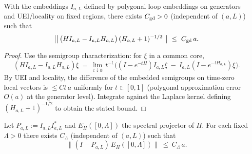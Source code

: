 \documentclass[11pt]{amsart}
\begin{document}
\begin{lemma}\label{lem:graph-defect-Oa}
With the embeddings $I_{a,L}$ defined by polygonal loop embeddings on generators and UEI/locality on fixed regions, there exists $C_{\rm gd}>0$ (independent of $(a,L)$) such that
\[
  \big\|\,\big(H I_{a,L}-I_{a,L} H_{a,L}\big)\,(H_{a,L}+1)^{-1/2}\,\big\|\ \le\ C_{\rm gd}\,a.
\]
\end{lemma}

\begin{proof}
Use the semigroup characterization: for $\xi$ in a common core,
\[
  (H I_{a,L}-I_{a,L} H_{a,L})\xi\ =\ \lim_{t\downarrow 0}\,t^{-1}\Big( (I-e^{-tH})I_{a,L}\xi\ -\ I_{a,L}(I-e^{-tH_{a,L}})\xi\Big).
\]
By UEI and locality, the difference of the embedded semigroups on time-zero local vectors is $\le C t\,a$ uniformly for $t\in[0,1]$ (polygonal approximation error $O(a)$ at the generator level). Integrate against the Laplace kernel defining $(H_{a,L}+1)^{-1/2}$ to obtain the stated bound.
\end{proof}

\begin{lemma}\label{lem:low-energy-proj}
Let $P_{a,L}:=I_{a,L}I_{a,L}^*$ and $E_H([0,\Lambda])$ the spectral projector of $H$. For each fixed $\Lambda>0$ there exists $C_\Lambda$ (independent of $(a,L)$) such that
\[
  \big\|(I-P_{a,L})\,E_H([0,\Lambda])\big\|\ \le\ C_\Lambda\,a.
\]
\end{lemma}
\end{document}

